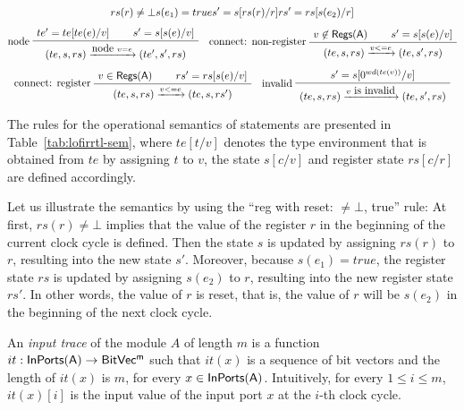 \begin{table}[t]
\begin{gather*}
   {\seqq{rs(r) \neq \bot}} {\seqq{ s(e_1)= true}} {\seqq{s' = s[rs(r)/r]}} {\seqq{rs' = rs[s(e_2)/r]}}
    \\[1ex]
    \inferii[node]
    {\seqq{(te, s, rs) \xrightarrow{\mbox{node } v = e} (te', s', rs)}}
   {\seqq{te' = te[te(e)/v]}} {\seqq{s' = s[s(e)/v]}}
    \quad
    \inferii[connect: non-register]
    {\seqq{(te, s, rs) \xrightarrow{v <= e} (te, s', rs)}}
   {\seqq{v \not \in \registers(A)}} {\seqq{s' = s[s(e)/v]}}
    \\[1ex]
    \inferii[connect: register]
    {\seqq{(te, s, rs) \xrightarrow{v <= e} (te, s, rs')}}
   {\seqq{v \in \registers(A)}} {\seqq{rs' = rs[s(e)/v]}}
  \quad
    \infer[invalid]
    {\seqq{(te, s, rs) \xrightarrow{v \mbox{ is invalid}} (te, s', rs)}}
   {\seqq{s' = s[0^{wd(te(v))}/v]}}
  \end{gather*}
  \caption{Operational semantics of LoFIRRTL statements.}
  \label{tab:lofirrtl-sem}
  \vspace{-6mm}
\end{table}

The rules for the operational semantics of statements are presented in Table~\ref{tab:lofirrtl-sem}, where $te[t/v]$ denotes the type environment that is obtained from $te$ by assigning $t$ to $v$,
the state $s[c/v]$ and register state $rs[c/r]$ are defined accordingly.


Let us illustrate the semantics by using the ``reg with reset: $\neq \bot$, true'' rule: At first, $rs(r) \neq \bot$ implies that the value of the register $r$ in the beginning of the current clock cycle is defined. Then the state $s$ is updated by assigning $rs(r)$ to $r$, resulting into the new state $s'$. Moreover, because $s(e_1)=true$, the register state $rs$ is updated by assigning $s(e_2)$ to $r$, resulting into the new register state $rs'$. In other words, the value of $r$ is reset, that is, the value of $r$ will be $s(e_2)$ in the beginning of the next clock cycle.
%

An \emph{input trace} of the module $A$ of length $m$ is a function $it:\sf InPorts(A)\rightarrow\sf BitVec^m$ such that $it(x)$ is a sequence of bit vectors and the length of $it(x)$ is $m$, for every $x \in \sf InPorts(A)$.
Intuitively, for every $1\leq i\leq m$, $it(x)[i]$ is the input value of the input port $x$ at the $i$-th clock cycle.


